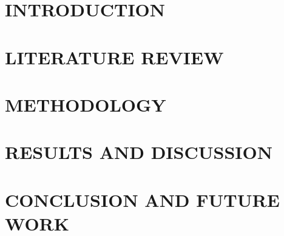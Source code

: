 \documentclass[12pt,twoside]{article}
\begin{document}
\cleardoublepage

\renewcommand{\contentsname}{TABLE OF CONTENTS}
\tableofcontents
\pagebreak
\listoffigures
\listoftables
\cleardoublepage
{}

\section{INTRODUCTION}

\cleardoublepage

\section{LITERATURE REVIEW}

\cleardoublepage

\section{METHODOLOGY}

\cleardoublepage

\section{RESULTS AND DISCUSSION}

\cleardoublepage

\section{CONCLUSION AND FUTURE WORK}

\cleardoublepage

\printbibliography[title={REFERENCES},heading=bibnumbered]
\cleardoublepage

\appendix

\cleardoublepage

%
\end{document}
